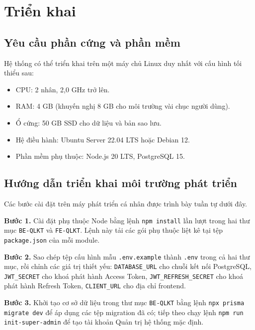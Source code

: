 \documentclass[../DoAn.tex]{subfiles}
\begin{document}
\section{Triển khai}
\label{section:4.5}

\subsection{Yêu cầu phần cứng và phần mềm}
\label{subsection:4.5.1}

Hệ thống có thể triển khai trên một máy chủ Linux duy nhất với cấu hình tối thiểu sau:

\begin{itemize}
    \item CPU: 2 nhân, 2{,}0 GHz trở lên.
    \item RAM: 4 GB (khuyến nghị 8 GB cho môi trường vài chục người dùng).
    \item Ổ cứng: 50 GB SSD cho dữ liệu và bản sao lưu.
    \item Hệ điều hành: Ubuntu Server 22.04 LTS hoặc Debian 12.
    \item Phần mềm phụ thuộc: Node.js 20 LTS, PostgreSQL 15.
\end{itemize}

\subsection{Hướng dẫn triển khai môi trường phát triển}
\label{subsection:4.5.2}

Các bước cài đặt trên máy phát triển cá nhân được trình bày tuần tự dưới đây.

\textbf{Bước 1.} Cài đặt phụ thuộc Node bằng lệnh \texttt{npm install} lần lượt trong hai thư mục \texttt{BE-QLKT} và \texttt{FE-QLKT}. Lệnh này tải các gói phụ thuộc liệt kê tại tệp \texttt{package.json} của mỗi module.

\textbf{Bước 2.} Sao chép tệp cấu hình mẫu \texttt{.env.example} thành \texttt{.env} trong cả hai thư mục, rồi chỉnh các giá trị thiết yếu: \texttt{DATABASE\_URL} cho chuỗi kết nối PostgreSQL, \texttt{JWT\_SECRET} cho khoá phát hành Access Token, \texttt{JWT\_REFRESH\_SECRET} cho khoá phát hành Refresh Token, \texttt{CLIENT\_URL} cho địa chỉ frontend.

\textbf{Bước 3.} Khởi tạo cơ sở dữ liệu trong thư mục \texttt{BE-QLKT} bằng lệnh \texttt{npx prisma migrate dev} để áp dụng các tệp migration đã có; tiếp theo chạy lệnh \texttt{npm run init-super-admin} để tạo tài khoản Quản trị hệ thống mặc định.
\end{document}

